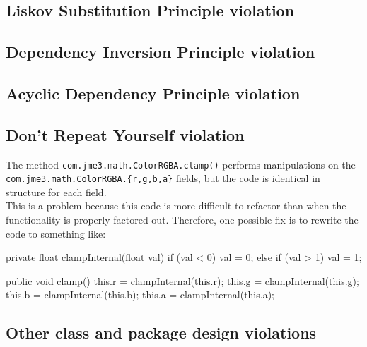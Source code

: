 \documentclass[a4paper, 10pt]{article}
\begin{document}
\subsection{Liskov Substitution Principle violation}
\label{sec:lsp_violation} %



\subsection{Dependency Inversion Principle violation}
\label{sec:dip_violation}


\subsection{Acyclic Dependency Principle violation}
\label{sec:adp_violation}


\subsection{Don't Repeat Yourself violation}
\label{sec:dry_violation}

The method \verb|com.jme3.math.ColorRGBA.clamp()| performs
manipulations on the \verb|com.jme3.math.ColorRGBA.{r,g,b,a}|
fields, but the code is identical in structure for each field.\\
This is a problem because this code is more difficult to refactor than
when the functionality is properly factored out. Therefore, one
possible fix is to rewrite the code to something like:
\begin{code}
  private float clampInternal(float val) {
    if (val < 0) {
      val = 0;
    } else if (val > 1) {
      val = 1;
    }
  }

  public void clamp() {
    this.r = clampInternal(this.r);
    this.g = clampInternal(this.g);
    this.b = clampInternal(this.b);
    this.a = clampInternal(this.a);
  }
\end{code}

\subsection{Other class and package design violations}
\label{sec:other_violations}
\end{document}
